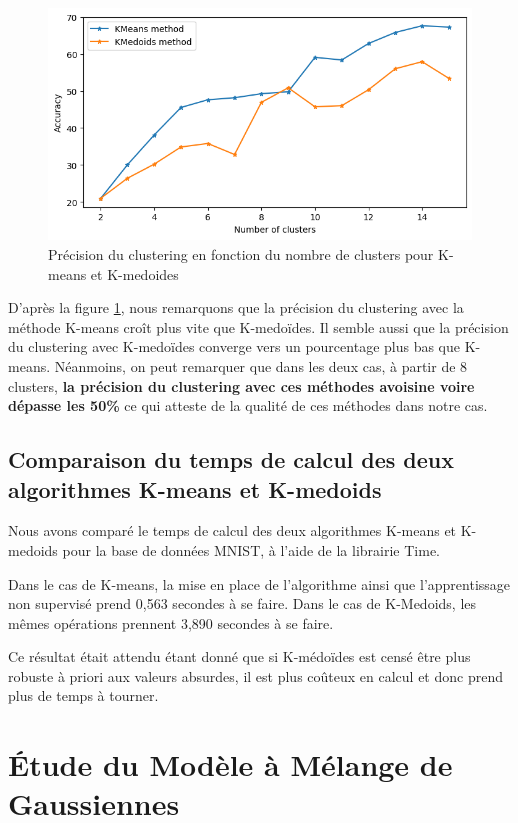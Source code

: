 \documentclass[french,a4paper,18pt]{article}
\begin{document}
\begin{figure}[h!]
    \centering
    \includegraphics[scale=0.4]{../images/mnist_comparison_accuracy.png}
    \caption{Précision du clustering en fonction du nombre de clusters pour K-means et K-medoides}\label{fig:mnist_comparison_accuracy}
\end{figure}

D'après la figure \ref{fig:mnist_comparison_accuracy}, nous remarquons que la précision du clustering avec la méthode K-means croît plus vite que K-medoïdes. Il semble aussi que la précision du clustering avec K-medoïdes converge vers un pourcentage plus bas que K-means. Néanmoins, on peut remarquer que dans les deux cas, à partir de 8 clusters, \textbf{la précision du clustering avec ces méthodes avoisine voire dépasse les 50\%} ce qui atteste de la qualité de ces méthodes dans notre cas.

\subsection{Comparaison du temps de calcul des deux algorithmes K-means et K-medoids}

Nous avons comparé le temps de calcul des deux algorithmes K-means et K-medoids pour la base de données MNIST, à l'aide de la librairie Time.

Dans le cas de K-means, la mise en place de l'algorithme ainsi que l'apprentissage non supervisé prend 0,563 secondes à se faire. Dans le cas de K-Medoids, les mêmes opérations prennent 3,890 secondes à se faire.

Ce résultat était attendu étant donné que si K-médoïdes est censé être plus robuste à priori aux valeurs absurdes, il est plus coûteux en calcul et donc prend plus de temps à tourner.


\section{Étude du Modèle à Mélange de Gaussiennes}
\end{document}
